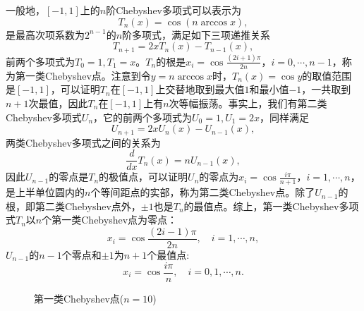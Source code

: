 \documentclass[a4paper,10pt]{ctexart}
\begin{document}
一般地，$ [-1,1] $上的$ n $阶Chebyshev多项式可以表示为
\begin{equation}
    T_n(x) = \cos(n\arccos x),
\end{equation}
是最高次项系数为$ 2^{n-1} $的$ n $阶多项式，满足如下三项递推关系
\begin{equation}
    T_{n+1} = 2xT_n(x)-T_{n-1}(x),
\end{equation}
前两个多项式为$ T_0=1,T_1=x $。$ T_n $的根是$ x_i = \cos \frac{(2i+1)\pi}{2n} $，$ i=0,\cdots ,n-1 $，称为第一类Chebyshev点。注意到令$ y=n\arccos x $时，$ T_n(x) = \cos y $的取值范围是$ [-1,1] $，可以证明$ T_n $在$ [-1,1] $上交替地取到最大值$ 1 $和最小值$ -1 $，一共取到$ n+1 $次最值，因此$ T_n $在$ [-1,1] $上有$ n $次等幅振荡。事实上，我们有第二类Chebyshev多项式$ U_n $，它的前两个多项式为$ U_0=1,U_1=2x $，同样满足
\begin{equation}
    U_{n+1} = 2xU_n(x)-U_{n-1}(x),
\end{equation}
两类Chebyshev多项式之间的关系为
\begin{equation}
    \frac{d}{dx} T_n(x) = n U_{n-1}(x),
\end{equation}
因此$ U_{n-1} $的零点是$ T_n $的极值点，可以证明$ U_n $的零点为$ x_i = \cos \frac{i\pi}{n+1} $，$ i=1,\cdots ,n $，是上半单位圆内的$ n $个等间距点的实部，称为第二类Chebyshev点。除了$ U_{n-1} $的根，即第二类Chebyshev点外，$ \pm 1 $也是$ T_n $的最值点。综上，第一类Chebyshev多项式$ T_n $以$ n $个第一类Chebyshev点为零点：
\begin{equation}
    x_i = \cos \frac{(2i-1)\pi}{2n},\quad i=1,\cdots ,n,
\end{equation}
$ U_{n-1} $的$ n-1 $个零点和$ \pm 1 $为$ n+1 $个最值点:
\begin{equation}
    x_i = \cos \frac{i\pi}{n},\quad i=0,1,\cdots ,n.
\end{equation}

\begin{figure}[h]
    \centering
    \caption{第一类Chebyshev点($n = 10$)}
\end{figure}
\end{document}
